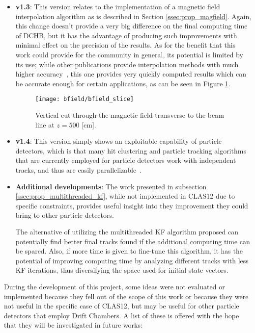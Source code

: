 \begin{itemize}
        \item \textbf{v1.3}: This version relates to the implementation of a magnetic field interpolation algorithm as is described in Section \ref{ssec:prop_magfield}.
        Again, this change doesn't provide a very big difference on the final computing time of DCHB, but it has the advantage of producing such improvements with minimal effect on the precision of the results.
        As for the benefit that this work could provide for the community in general, its potential is limited by its use; while other publications provide interpolation methods with much higher accuracy~\cite{mackay2006divergence}, this one provides very quickly computed results which can be accurate enough for certain applications, as can be seen in Figure \ref{fig:bfield_slice}.
        
            \begin{figure}[ht]
                \centering
                \texttt{[image: bfield/bfield\_slice]}
                \caption{\label{fig:bfield_slice} Vertical cut through the magnetic field transverse to the beam line at $z=500$ [cm].}
            \end{figure}

        \item \textbf{v1.4}: This version simply shows an exploitable capability of particle detectors, which is that many hit clustering and particle tracking algorithms that are currently employed for particle detectors work with independent tracks, and thus are easily parallelizable~\cite{blum2008particle}.
        
        \item \textbf{Additional developments}: The work presented in subsection \ref{ssec:prop_multithreaded_kf}, while not implemented in CLAS12 due to specific constraints, provides useful insight into they improvement they could bring to other particle detectors.
        
        \newpage
        
        The alternative of utilizing the multithreaded KF algorithm proposed can potentially find better final tracks found if the additional computing time can be spared.
        Also, if more time is given to fine-tune this algorithm, it has the potential of improving computing time by analyzing different tracks with less KF iterations, thus diversifying the space used for initial state vectors.
    \end{itemize}

During the development of this project, some ideas were not evaluated or implemented because they fell out of the scope of this work or because they were not useful in the specific case of CLAS12, but may be useful for other particle detectors that employ Drift Chambers.
A list of these is offered with the hope that they will be investigated in future works:

